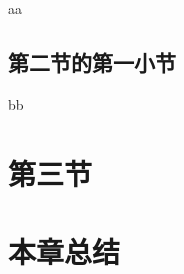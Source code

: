 aa

\subsection{第二节的第一小节}

bb

\section{第三节}

\section{本章总结}

\ifprint
\newpage
\thispagestyle{empty}
\mbox{}

\clearpage
\setcounter{page}{10}
\fi
